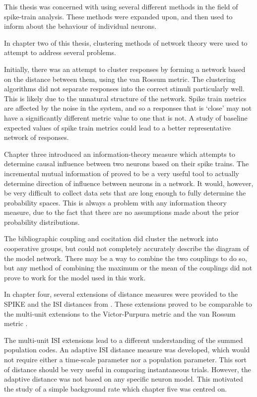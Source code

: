 This thesis was concerned with using several different methods in the field of spike-train analysis.  These methods were expanded upon, and then used to inform about the behaviour of individual neurons.

In chapter two of this thesis, clustering methods of network theory were used to attempt to address several problems.  

Initially, there was an attempt to cluster responses by forming a network based on the distance between them, using the van Rossum metric. The clustering algorithms did not separate responses into the correct stimuli particularly well.  This is likely due to the unnatural structure of the network.  Spike train metrics are affected by the noise in the system, and so a responses that is \lq{}close\rq{} may not have a significantly different metric value to one that is not.  A study of baseline expected values of spike train metrics could lead to a better representative network of responses.

Chapter three introduced an information-theory measure which attempts to determine causal influence between two neurons based on their spike trains. The incremental mutual information of \citep{SinghLesica2010a} proved to be a very useful tool to actually determine direction of influence between neurons in a network.  It would, however, be very difficult to collect data sets that are long enough to fully determine the probability spaces.  This is always a problem with any information theory measure, due to the fact that there are no assumptions made about the prior probability distributions.

The bibliographic coupling and cocitation did cluster the network into cooperative groups, but could not completely accurately describe the diagram of the model network.  There may be a way to combine the two couplings to do so, but any method of combining the maximum or the mean of the couplings did not prove to work for the model used in this work. 

In chapter four, several extensions of distance measures were provided to the SPIKE and the ISI distances from \citep{KreuzEtAl2007a,KreuzEtAl2012a}. These extensions proved to be comparable to the multi-unit extensions to the Victor-Purpura metric \citep{AronovEtAl2003a} and the van Rossum metric \citep{HoughtonSen2008a}.

The multi-unit ISI extensions lead to a different understanding of the summed population codes.  An adaptive ISI distance measure was developed, which would not require either a time-scale parameter nor a population parameter.  This sort of distance should be very useful in comparing instantaneous trials.  However, the adaptive distance was not based on any specific neuron model.  This motivated the study of a simple background rate which chapter five was centred on.


